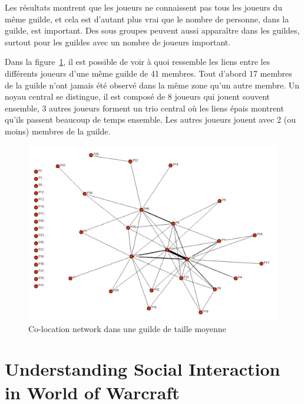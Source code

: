 \documentclass[11pt,a4paper]{article}
\begin{document}
\par Les résultats montrent que les joueurs ne connaissent pas tous les joueurs du même guilde, et cela est d'autant plus vrai que le nombre de personne, dans la guilde, est important. Des sous groupes peuvent aussi apparaître dans les guildes, surtout pour les guildes avec un nombre de joueurs important. 
\par Dans la figure~\ref{co-location}, il est possible de voir à quoi ressemble les liens entre les différents joueurs d'une même guilde de 41 membres. Tout d'abord 17 membres de la guilde n'ont jamais été observé dans la même zone qu'un autre membre. Un noyau central se distingue, il est composé de 8 joueurs qui jouent souvent ensemble, 3 autres joueurs forment un trio central où les liens épais montrent qu'ils passent beaucoup de temps ensemble. Les autres joueurs jouent avec 2 (ou moins) membres de la guilde.
	 \begin{figure}[!h]
        \centering
        \includegraphics[scale=0.95]{./images/co-location.png}
        \caption{Co-location network dans une guilde de taille moyenne}
        \label{co-location}
        \end{figure}
\newpage
\section{Understanding Social Interaction in World of Warcraft}
\end{document}
